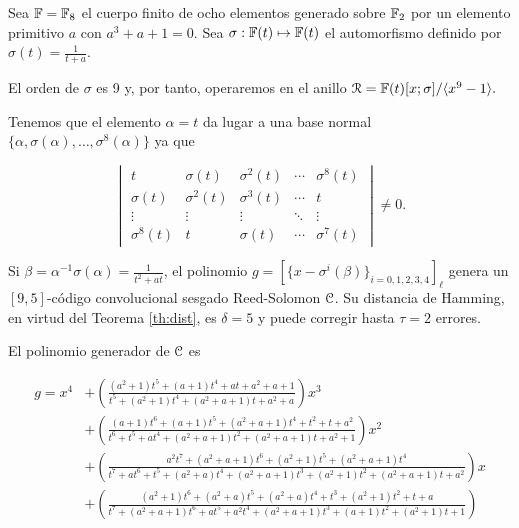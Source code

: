 \begin{ejemplo}\label{ej:sugiyama}

Sea $\mathbb{F} = \mathbb{F}_8$ el cuerpo finito de ocho elementos generado sobre $\mathbb{F}_2$ por un elemento primitivo $a$ con $a^3 + a + 1 = 0$. Sea $\sigma : \mathbb{F}(t) \mapsto \mathbb{F}(t)$ el automorfismo definido por $\sigma(t) = \frac{1}{t+a}$.

El orden de $\sigma$ es 9 y, por tanto, operaremos en el anillo $\mathcal{R} = \mathbb{F}(t)[x;\sigma]/\langle x^9 - 1 \rangle.$

Tenemos que el elemento $\alpha = t$ da lugar a una base normal $\{\alpha,\sigma(\alpha),\dots,\sigma^8(\alpha)\}$ ya que 

$$\begin{vmatrix}
    t & \sigma(t) & \sigma^2(t) & \cdots & \sigma^{8}(t) \\
    \sigma(t) & \sigma^2(t) & \sigma^3(t) & \cdots & t\\
    \vdots & \vdots & \vdots & \ddots & \vdots \\
    \sigma^{8}(t) & t & \sigma(t) & \cdots & \sigma^{7}(t)
\end{vmatrix} \neq 0.$$

Si $\beta = \alpha^{-1}\sigma(\alpha) = \frac{1}{t^2 + at}$, el polinomio $g = \left[ \{x - \sigma^i(\beta)\}_{i=0,1,2,3,4} \right]_\ell$ genera un $[9,5]$-código convolucional sesgado Reed-Solomon $\mathcal C$. Su distancia de Hamming, en virtud del Teorema \ref{th:dist}, es $\delta = 5$ y puede corregir hasta $\tau = 2$ errores.

El polinomio generador de $\mathcal C$ es

\begin{equation}
    \begin{aligned}
    g = x^4 &+ \left( \frac{(a^2 + 1)t^5 + (a + 1)t^4 + a t + a^2 + a + 1}{t^5 + (a^2 + 1)t^4 + (a^2 + a + 1)t + a^2 + a} \right) x^3 \\
    &+ \left( \frac{(a + 1)t^6 + (a + 1)t^5 + (a^2 + a + 1)t^4 + t^2 + t + a^2}{t^6 + t^5 + a t^4 + (a^2 + a + 1)t^2 + (a^2 + a + 1)t + a^2 + 1} \right) x^2 \\
    &+ \left( \frac{a^2 t^7 + (a^2 + a + 1)t^6 + (a^2 + 1)t^5 + (a^2 + a + 1)t^4}{t^7 + a t^6 + t^5 + (a^2 + a)t^4 + (a^2 + a + 1)t^3 + (a^2 + 1)t^2 + (a^2 + a + 1)t + a^2} \right) x \\
    &+ \left( \frac{(a^2 + 1)t^6 + (a^2 + a)t^5 + (a^2 + a)t^4 + t^3 + (a^2 + 1)t^2 + t + a}{t^7 + (a^2 + a + 1)t^6 + a t^5 + a^2 t^4 + (a^2 + a + 1)t^3 + (a + 1)t^2 + (a^2 + 1)t + 1} \right)
\end{aligned}
\end{equation}
    

\end{ejemplo}
